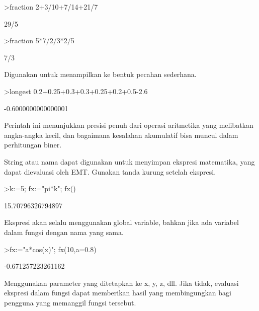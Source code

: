 \documentclass[a4paper,10pt]{article}
\begin{document}
\begin{eulernotebook}
\begin{eulercomment}
\begin{eulercomment}
\begin{eulercomment}
\end{eulercomment}
\begin{eulerprompt}
>fraction 2+3/10+7/14+21/7
\end{eulerprompt}
\begin{euleroutput}
  29/5
\end{euleroutput}
\begin{eulerprompt}
>fraction 5*7/2/3*2/5
\end{eulerprompt}
\begin{euleroutput}
  7/3
\end{euleroutput}
\begin{eulercomment}
Digunakan untuk menampilkan ke bentuk pecahan sederhana.

\end{eulercomment}
\begin{eulerprompt}
>longest 0.2+0.25+0.3+0.3+0.25+0.2+0.5-2.6
\end{eulerprompt}
\begin{euleroutput}
      -0.6000000000000001 
\end{euleroutput}
\begin{eulercomment}
Perintah ini menunjukkan presisi penuh dari operasi aritmetika yang
melibatkan angka-angka kecil, dan bagaimana kesalahan akumulatif bisa
muncul dalam perhitungan biner.

\end{eulercomment}
\begin{eulercomment}
String atau nama dapat digunakan untuk menyimpan ekspresi matematika,
yang dapat dievaluasi oleh EMT. Gunakan tanda kurung setelah ekspresi.
\end{eulercomment}
\begin{eulerprompt}
>k:=5; fx:="pi*k"; fx()
\end{eulerprompt}
\begin{euleroutput}
  15.70796326794897
\end{euleroutput}
\begin{eulercomment}
Ekspresi akan selalu menggunakan global variable, bahkan jika ada
variabel dalam fungsi dengan nama yang sama.

\end{eulercomment}
\begin{eulerprompt}
>fx:="a*cos(x)"; fx(10,a=0.8)
\end{eulerprompt}
\begin{euleroutput}
  -0.671257223261162
\end{euleroutput}
\begin{eulercomment}
Menggunakan parameter yang ditetapkan ke x, y, z, dll. Jika tidak,
evaluasi ekspresi dalam fungsi dapat memberikan hasil yang
membingungkan bagi pengguna yang memanggil fungsi tersebut.


\end{eulercomment}
\end{eulercomment}
\end{eulercomment}
\end{eulernotebook}
\end{document}
